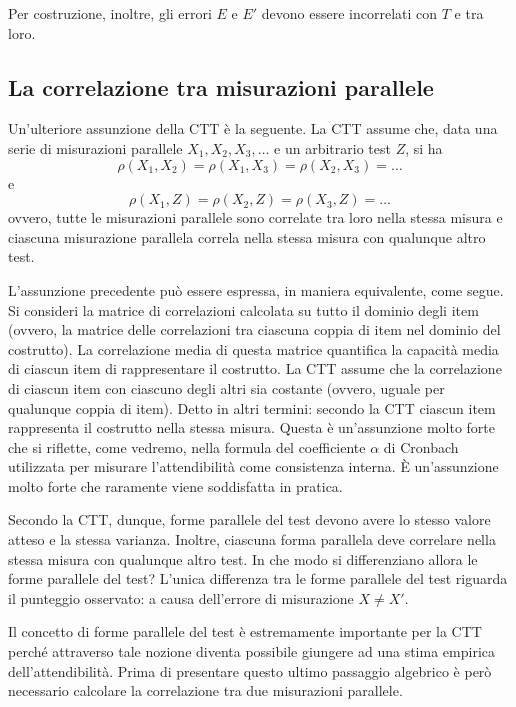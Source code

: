 Per costruzione, inoltre, gli errori $E$ e $E'$ devono essere incorrelati con $T$ e tra loro.

\subsection{La correlazione tra misurazioni parallele}

Un'ulteriore assunzione della CTT è la seguente.
La CTT assume che, data una serie di misurazioni parallele $X_1, X_2, X_3, \dots$ e un arbitrario test $Z$, si ha
\[
\rho(X_1, X_2) = \rho(X_1, X_3) = \rho(X_2, X_3) = \dots
\]
e
\[
\rho(X_1, Z) = \rho(X_2,Z) = \rho(X_3, Z) = \dots
\]
ovvero, tutte le misurazioni parallele sono correlate tra loro nella stessa misura e ciascuna misurazione parallela correla nella stessa misura con qualunque altro test.

L'assunzione precedente può essere espressa, in maniera equivalente, come segue. Si consideri la matrice di correlazioni calcolata su tutto il dominio degli item (ovvero, la matrice delle correlazioni tra ciascuna coppia di item nel dominio del costrutto). La correlazione media di questa matrice quantifica la capacità media di ciascun item di rappresentare il costrutto. La CTT assume che la correlazione di ciascun item con ciascuno degli altri sia costante (ovvero, uguale per qualunque coppia di item). Detto in altri termini: secondo la CTT ciascun item rappresenta il costrutto nella stessa misura. 
Questa è un'assunzione molto forte che si riflette, come vedremo, nella formula del coefficiente $\alpha$ di Cronbach utilizzata per misurare l'attendibilità come consistenza interna. È un'assunzione molto forte che raramente viene soddisfatta in pratica.

Secondo la CTT, dunque, forme parallele del test devono avere lo stesso valore atteso e la stessa varianza. Inoltre, ciascuna forma parallela deve correlare nella stessa misura con qualunque altro test. In che modo si differenziano allora le forme parallele del test? L'unica differenza tra le forme parallele del test riguarda il punteggio osservato: a causa dell'errore di misurazione $X \neq X'$. 

Il concetto di forme parallele del test è estremamente importante per la CTT perché attraverso tale nozione diventa possibile giungere ad una stima empirica dell'attendibilità. Prima di presentare questo ultimo passaggio algebrico è però necessario calcolare la correlazione tra due misurazioni parallele.

